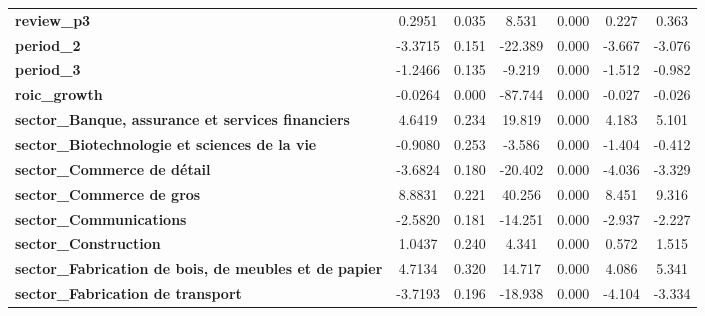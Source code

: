 \begin{center}
\begin{tabular}{lcccccc}
\textbf{review\_p3}                                                   &       0.2951  &        0.035     &     8.531  &         0.000        &        0.227    &        0.363     \\
\textbf{period\_2}                                                    &      -3.3715  &        0.151     &   -22.389  &         0.000        &       -3.667    &       -3.076     \\
\textbf{period\_3}                                                    &      -1.2466  &        0.135     &    -9.219  &         0.000        &       -1.512    &       -0.982     \\
\textbf{roic\_growth}                                                 &      -0.0264  &        0.000     &   -87.744  &         0.000        &       -0.027    &       -0.026     \\
\textbf{sector\_Banque, assurance et services financiers}             &       4.6419  &        0.234     &    19.819  &         0.000        &        4.183    &        5.101     \\
\textbf{sector\_Biotechnologie et sciences de la vie}                 &      -0.9080  &        0.253     &    -3.586  &         0.000        &       -1.404    &       -0.412     \\
\textbf{sector\_Commerce de détail}                                   &      -3.6824  &        0.180     &   -20.402  &         0.000        &       -4.036    &       -3.329     \\
\textbf{sector\_Commerce de gros}                                     &       8.8831  &        0.221     &    40.256  &         0.000        &        8.451    &        9.316     \\
\textbf{sector\_Communications}                                       &      -2.5820  &        0.181     &   -14.251  &         0.000        &       -2.937    &       -2.227     \\
\textbf{sector\_Construction}                                         &       1.0437  &        0.240     &     4.341  &         0.000        &        0.572    &        1.515     \\
\textbf{sector\_Fabrication de bois, de meubles et de papier}         &       4.7134  &        0.320     &    14.717  &         0.000        &        4.086    &        5.341     \\
\textbf{sector\_Fabrication de transport}                             &      -3.7193  &        0.196     &   -18.938  &         0.000        &       -4.104    &       -3.334     \\

\end{tabular}
\end{center}

